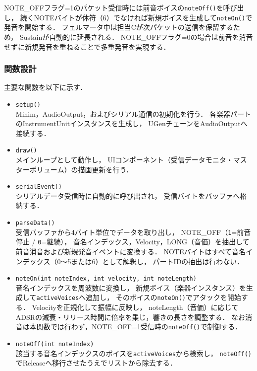 NOTE\_OFFフラグ=1のパケット受信時には前音ボイスの\texttt{noteOff()}を呼び出し，
続くNOTEバイトが休符（6）でなければ新規ボイスを生成して\texttt{noteOn()}で発音を開始する．
フェルマータ中は担当Cが次パケットの送信を保留するため，
Sustainが自動的に延長される．
NOTE\_OFFフラグ=0の場合は前音を消音せずに新規発音を重ねることで多重発音を実現する．

\subsubsection{関数設計}

主要な関数を以下に示す．

\begin{itemize}

  \item \texttt{setup()} \\
  Minim，AudioOutput，およびシリアル通信の初期化を行う．
  各楽器パートのInstrumentUnitインスタンスを生成し，
  UGenチェーンをAudioOutputへ接続する．

  \item \texttt{draw()} \\
  メインループとして動作し，
  UIコンポーネント（受信データモニタ・マスターボリューム）の描画更新を行う．

  \item \texttt{serialEvent()} \\
  シリアルデータ受信時に自動的に呼び出され，
  受信バイトをバッファへ格納する．

  \item \texttt{parseData()} \\
  受信バッファから4バイト単位でデータを取り出し，
  NOTE\_OFF（\texttt{1}=前音停止 / \texttt{0}=継続），
  音名インデックス，Velocity，LONG（音価）を抽出して
  前音消音および新規発音イベントに変換する．
  NOTEバイトはすべて音名インデックス（0〜5または6）として解釈し，
  パートIDの抽出は行わない．

  \item \texttt{noteOn(int noteIndex, int velocity, int noteLength)} \\
  音名インデックスを周波数に変換し，
  新規ボイス（楽器インスタンス）を生成して\texttt{activeVoices}へ追加し，
  そのボイスの\texttt{noteOn()}でアタックを開始する．
  Velocityを正規化して振幅に反映し，
  noteLength（音価）に応じてADSRの減衰・リリース時間に倍率を乗じ，響きの長さを調整する．
  なお消音は本関数では行わず，NOTE\_OFF=1受信時の\texttt{noteOff()}で制御する．

  \item \texttt{noteOff(int noteIndex)} \\
  該当する音名インデックスのボイスを\texttt{activeVoices}から検索し，
  \texttt{noteOff()}でReleaseへ移行させたうえでリストから除去する．


\end{itemize}
